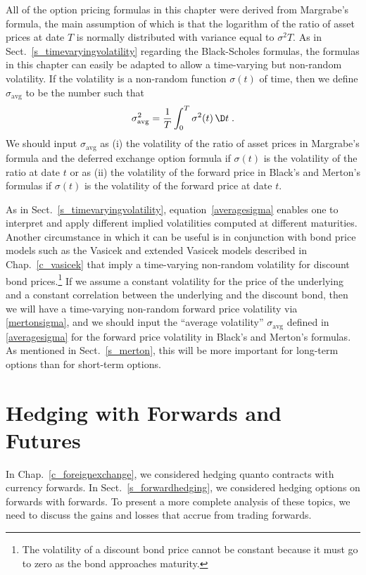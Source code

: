 All of the option pricing formulas in this chapter were derived from Margrabe's formula, the main assumption of which is that the logarithm of the ratio of asset prices at date $T$ is normally distributed with variance equal to $\sigma^2T$.  As in Sect.~\ref{s_timevaryingvolatility} regarding the Black-Scholes formulas, the formulas in this chapter can easily be adapted to allow a time-varying but non-random volatility.  If the volatility is a non-random function $\sigma(t)$ of time, then we define $\sigma_{\text{avg}}$ to be the number such that
\begin{equation}\label{averagesigma}
\sigma_{\text{avg}}^2 = \frac{1}{T}\int_0^T \sigma^2(t)\,\D t\;.
\end{equation} 
We should input $\sigma_{\text{avg}}$ as (i) the volatility of the ratio of asset prices in Margrabe's formula and the deferred exchange option formula if $\sigma(t)$ is the volatility of the ratio at date $t$ or as (ii) the volatility of the forward price in Black's and Merton's formulas if $\sigma(t)$ is the volatility of the forward price at date $t$.

As in Sect.~\ref{s_timevaryingvolatility}, equation~\eqref{averagesigma} enables one to interpret and apply different implied volatilities computed at different maturities.   Another circumstance in which it can be useful is in conjunction with bond price models such as the Vasicek and extended Vasicek models described in Chap.~\ref{c_vasicek} that imply a time-varying non-random volatility for discount bond prices.\footnote{The volatility of a discount bond price cannot be constant because it must go to zero as the bond approaches maturity.}  If we assume a constant volatility for the price of the underlying and a constant correlation between the underlying and the discount bond, then we will have a time-varying non-random  forward price volatility via  \eqref{mertonsigma}, and we should input the ``average volatility'' $\sigma_{\text{avg}}$ defined in \eqref{averagesigma} for the forward price volatility in Black's and Merton's formulas.  As mentioned in Sect.~\ref{s_merton}, this will be more important for long-term options than for short-term options.

\section{Hedging with Forwards and Futures}\label{s_hedgingforwards}

In Chap.~\ref{c_foreignexchange}, we considered hedging quanto contracts with currency forwards.  In Sect.~\ref{s_forwardhedging}, we considered hedging options on forwards with forwards.  To present a more complete analysis of these topics, we need to discuss the gains and losses that accrue from trading forwards.

